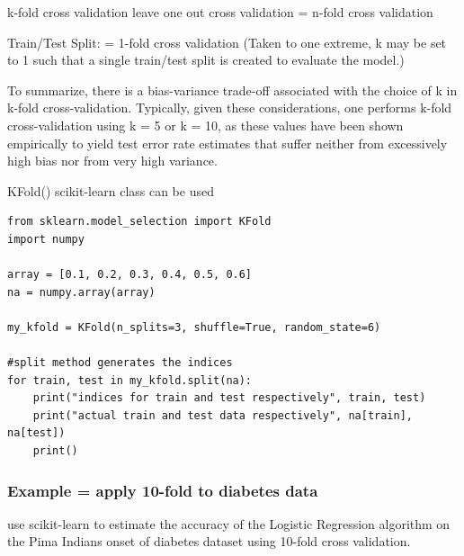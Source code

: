 \documentclass[11pt]{article}
\begin{document}
k-fold cross validation
leave one out cross validation = n-fold cross validation

Train/Test Split: = 1-fold cross validation
(Taken to one extreme, k may be set to 1 such that a single train/test split is created to evaluate the model.)

To summarize, there is a bias-variance trade-off associated with the
choice of k in k-fold cross-validation. Typically, given these
considerations, one performs k-fold cross-validation using k = 5 or k
= 10, as these values have been shown empirically to yield test error
rate estimates that suffer neither from excessively high bias nor from
very high variance.

KFold() scikit-learn class can be used

\begin{verbatim}
from sklearn.model_selection import KFold
import numpy

array = [0.1, 0.2, 0.3, 0.4, 0.5, 0.6]
na = numpy.array(array)

my_kfold = KFold(n_splits=3, shuffle=True, random_state=6)

#split method generates the indices
for train, test in my_kfold.split(na):
    print("indices for train and test respectively", train, test)
    print("actual train and test data respectively", na[train], na[test])
    print()

\end{verbatim}


\subsubsection{Example = apply 10-fold to diabetes data}
\label{sec:org3ec63f3}
use scikit-learn to estimate the accuracy of the Logistic Regression
algorithm on the Pima Indians onset of diabetes dataset using 10-fold
cross validation.
\end{document}
